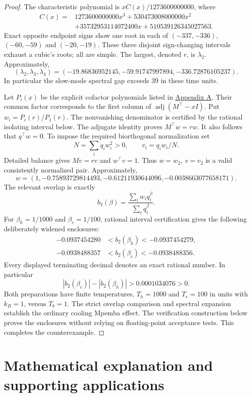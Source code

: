 \documentclass[11pt]{article}
\begin{document}
\begin{proof}
The characteristic polynomial is $xC(x)/1273600000000$, where
\begin{align*}
C(x)={}&1273600000000x^3+530473008000000x^2\\
&+35732953114072400x+510539126345027563.
\end{align*}
Exact opposite endpoint signs show one root in each of $(-337,-336)$, $(-60,-59)$ and $(-20,-19)$. These three disjoint sign-changing intervals exhaust a cubic's roots; all are simple. The largest, denoted $r$, is $\lambda_2$. Approximately,
\[
(\lambda_2,\lambda_3,\lambda_4)=(-19.86836952145,-59.91747997894,-336.72876105237).
\]
In particular the slow-mode spectral gap exceeds 39 in these time units.

Let $P_i(x)$ be the explicit cofactor polynomials listed in \hyperref[app:cofactors]{Appendix A}. Their common factor corresponds to the first column of $\operatorname{adj}(M^\top-xI)$. Put $w_i=P_i(r)/P_1(r)$. The nonvanishing denominator is certified by the rational isolating interval below. The adjugate identity proves $M^\top w=rw$. It also follows that $q^\top w=0$. To impose the required biorthogonal normalization set
\[
N=\sum_iq_iw_i^2>0,\qquad v_i=q_iw_i/N.
\]
Detailed balance gives $Mv=rv$ and $w^\top v=1$. Thus $w=w_2$, $v=v_2$ is a valid consistently normalized pair. Approximately,
\[
w=(1,-0.75893729814493,-0.61211930644096,-0.0038663077658171).
\]
The relevant overlap is exactly
\[
b_2(\beta)=\frac{\sum_iw_iq_i^\beta}{\sum_iq_i^\beta}.
\]
For $\beta_h=1/1000$ and $\beta_c=1/100$, rational interval certification gives the following deliberately widened enclosures:
\begin{align*}
-0.0937454280&<b_2(\beta_h)<-0.0937454279,\\
-0.0938488357&<b_2(\beta_c)<-0.0938488356.
\end{align*}
Every displayed terminating decimal denotes an exact rational number. In particular
\[
|b_2(\beta_c)|-|b_2(\beta_h)|>0.0001034076>0.
\]
Both preparations have finite temperatures, $T_h=1000$ and $T_c=100$ in units with $k_B=1$, versus $T_b=1$. The strict overlap comparison and spectral expansion establish the ordinary cooling Mpemba effect. The verification construction below proves the enclosures without relying on floating-point acceptance tests. This completes the counterexample.
\end{proof}

\section{Mathematical explanation and supporting applications}
\end{document}
